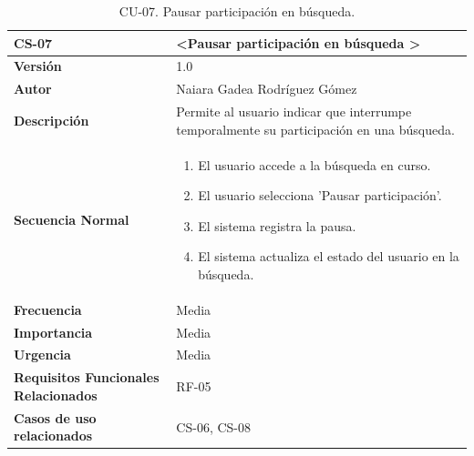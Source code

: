\begin{table}[htbp] %
\centering
\begin{tabular}{ |m{3cm}|m{11cm}|  } 
\hline
\cellcolor[HTML]{B9E3F0}\centering\textbf{CS-07} & \cellcolor[HTML]{B9E3F0}\textbf{\textless Pausar participación en búsqueda \textgreater}\\

\hline
\cellcolor[HTML]{EFEFEF}\textbf{Versión}             & 1.0  \\
\hline
\cellcolor[HTML]{EFEFEF}\textbf{Autor}                & Naiara Gadea Rodríguez Gómez\\
\hline
\cellcolor[HTML]{EFEFEF}\textbf{Descripción}                & { Permite al usuario indicar que interrumpe temporalmente su participación en una búsqueda. }\\
\hline
\cellcolor[HTML]{EFEFEF}\textbf{Secuencia \newline Normal}                &                 
        \begin{enumerate}
            \item El usuario accede a la búsqueda en curso.
            \item El usuario selecciona 'Pausar participación'.
            \item El sistema registra la pausa.
            \item El sistema actualiza el estado del usuario en la búsqueda.
        \end{enumerate}\\
\hline
\cellcolor[HTML]{EFEFEF}\textbf{Frecuencia}                & Media\\
\hline
\cellcolor[HTML]{EFEFEF}\textbf{Importancia}                & Media\\
\hline
\cellcolor[HTML]{EFEFEF}\textbf{Urgencia}                & Media\\
\hline
\cellcolor[HTML]{EFEFEF}\textbf{Requisitos Funcionales Relacionados}                & { RF-05 }\\
\hline
\cellcolor[HTML]{EFEFEF}\textbf{Casos de uso relacionados}                & { CS-06, CS-08 }\\
\hline
\end{tabular}
\caption{CU-07. Pausar participación en búsqueda.}
\end{table}


